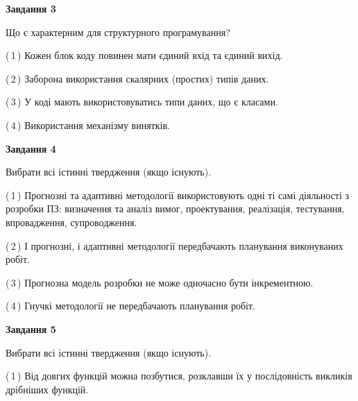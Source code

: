 \documentclass[10pt, ukrainian]{article}
\begin{document}
{\begin {large}
{\begin {center}\textbf{Завдання 3}\end {center}}\par
Що є характерним для структурного програмування?\par
\vspace{2mm}



(\,1\,) Кожен блок коду повинен мати єдиний вхід та єдиний вихід.%



(\,2\,) Заборона використання скалярних (простих) типів даних. %



(\,3\,) У коді мають використовуватись типи даних, що є класами. %



(\,4\,) Використання механізму винятків. %


{\begin {center}\textbf{Завдання 4}\end {center}}\par
Вибрати всі істинні твердження (якщо існують).\par
\vspace{2mm}



(\,1\,) Прогнозні та адаптивні методології використовують одні ті самі діяльності з розробки ПЗ: визначення та аналіз вимог, проектування, реалізація, тестування, впровадження, супроводження. %



(\,2\,) І прогнозні, і адаптивні методології передбачають планування виконуваних робіт. %



(\,3\,) Прогнозна модель розробки не може одночасно бути інкрементною. %



(\,4\,) Гнучкі методології не передбачають планування робіт. %


{\begin {center}\textbf{Завдання 5}\end {center}}\par
Вибрати всі істинні твердження (якщо існують).\par
\vspace{2mm}



(\,1\,) Від довгих функцій можна позбутися, розклавши їх у послідовність викликів дрібніших функцій. %




\end{large}}
\end{document}
